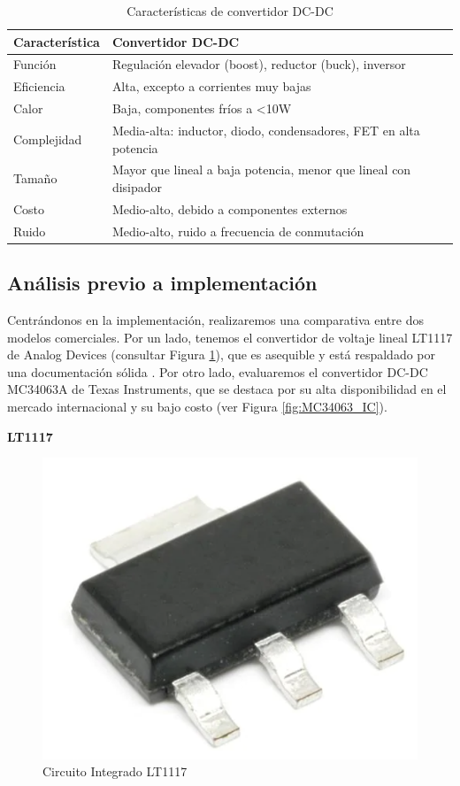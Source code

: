 \begin{table}[h]
    \centering
    \caption{Características de convertidor DC-DC}
    \label{tab:caracteristicas_DC_DC}
    \begin{tabular}{ll}
        \toprule
        Característica & Convertidor DC-DC \\ 
        \midrule
        Función & Regulación elevador (boost), reductor (buck), inversor \\ 
        Eficiencia & Alta, excepto a corrientes muy bajas \\ 
        Calor & Baja, componentes fríos a <10W \\ 
        Complejidad & Media-alta: inductor, diodo, condensadores, FET en alta potencia \\ 
        Tamaño & Mayor que lineal a baja potencia, menor que lineal con disipador \\ 
        Costo & Medio-alto, debido a componentes externos \\ 
        Ruido & Medio-alto, ruido a frecuencia de conmutación \\ 
        \bottomrule
    \end{tabular}
\end{table}

\subsection{Análisis previo a implementación}

Centrándonos en la implementación, realizaremos una comparativa entre dos modelos comerciales. Por un lado, tenemos el convertidor de voltaje lineal LT1117 de Analog Devices (consultar Figura \ref{fig:LT1117_IC}), que es asequible y está respaldado por una documentación sólida \cite{analog_lt1117fd}. Por otro lado, evaluaremos el convertidor DC-DC MC34063A de Texas Instruments, que se destaca por su alta disponibilidad en el mercado internacional y su bajo costo \cite{ti_mc34063a} (ver Figura \ref{fig:MC34063_IC}).

\textbf{LT1117}

\begin{figure}[h]
  \centering
  \includegraphics[width=0.20\linewidth]{Pictures/LT1117_AnalogD.png} 
  \caption{Circuito Integrado LT1117}
  \label{fig:LT1117_IC}
\end{figure}

